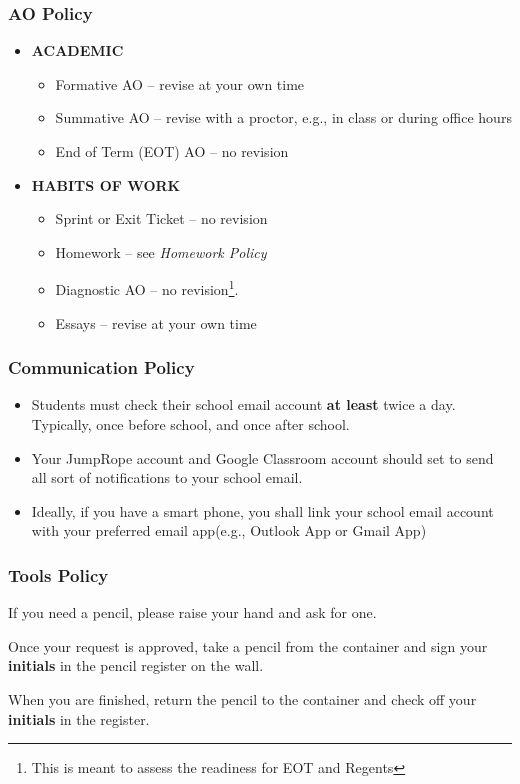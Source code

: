 \documentclass[10pt, aspectratio=169]{beamer}
\begin{document}
\begin{frame}
\frametitle{AO Policy}
\begin{itemize}
\item
\textbf{ACADEMIC}
\begin{itemize}
\item
Formative AO -- revise at your own time
\item
Summative AO -- revise with a  proctor, e.g.,  in class or during office hours
\item 
End of Term (EOT) AO -- no revision
\end{itemize}
\item
\textbf{HABITS OF WORK}
\begin{itemize}
\item
Sprint or Exit Ticket -- no revision
\item 
Homework -- see \textit{Homework Policy}
\item
Diagnostic AO -- no revision\footnote{This is meant to assess the readiness for EOT and Regents}.
\item
Essays -- revise at your own time
\end{itemize}
\end{itemize}
\end{frame}

\begin{frame}
\frametitle{Communication Policy}
\pause

\begin{itemize}
\item
Students must check their school email  account \textbf{at least} twice a day. Typically, once before school, and once after school.\pause
{}
\item Your JumpRope account and Google Classroom account should set to send all sort of notifications to your school email.\pause
{}
\item Ideally, if you have a smart phone, you shall link your school email account with your preferred email app(e.g., Outlook App or Gmail App)
\end{itemize}
\end{frame}

\begin{frame}
\frametitle{Tools Policy}
\pause

If you need a pencil, please raise your hand and ask for one.

Once your request is approved, take a pencil from the container and sign your \textbf{initials} in the pencil register on the wall.

When you are finished, return the pencil to the container and check off your \textbf{initials} in the register.
\end{frame}
\end{document}
